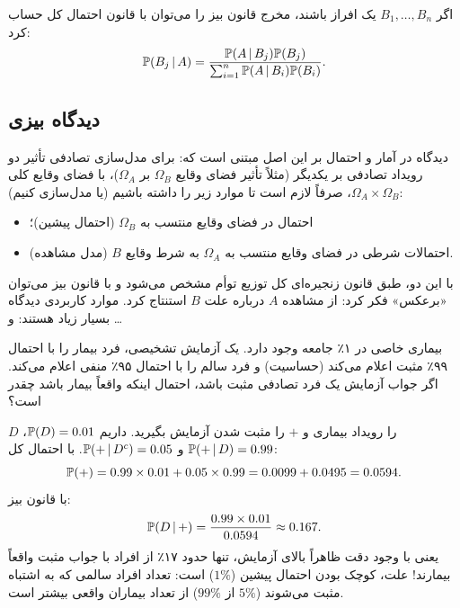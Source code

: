 \begin{theorem}
اگر $B_1,\ldots,B_n$ یک افراز باشند، مخرج قانون بیز را می‌توان با قانون احتمال کل حساب کرد:
\[
\mathbb{P}(B_j\,|\, A)=\frac{\mathbb{P}(A\,|\, B_j)\mathbb{P}(B_j)}{\sum_{i=1}^{n}\mathbb{P}(A\,|\, B_i)\mathbb{P}(B_i)} .
\]
\end{theorem}

\subsection{دیدگاه بیزی}
دیدگاه  در آمار و احتمال بر این اصل مبتنی است که: برای مدل‌سازی تصادفی تأثیر دو رویداد تصادفی بر یکدیگر (مثلاً تأثیر فضای وقایع $\Omega_B$ بر $\Omega_A$)، با فضای وقایع کلی $\Omega_A\times\Omega_B$، صرفاً لازم است تا موارد زیر را داشته باشیم (یا مدل‌سازی کنیم):
\begin{itemize}
\item احتمال در فضای وقایع منتسب به $\Omega_B$ (احتمال پیشین)؛
\item احتمالات شرطی در فضای وقایع منتسب به $\Omega_A$ به شرط وقایع $B$ (مدل مشاهده).
\end{itemize}
با این دو، طبق قانون زنجیره‌ای کل توزیع توأم مشخص می‌شود و با قانون بیز می‌توان «برعکس» فکر کرد: از مشاهده $A$ درباره علت $B$ استنتاج کرد. موارد کاربردی دیدگاه  بسیار زیاد هستند:
 و \ldots

\begin{example}
بیماری خاصی در ۱٪ جامعه وجود دارد. یک آزمایش تشخیصی، فرد بیمار را با احتمال ۹۹٪ مثبت اعلام می‌کند (حساسیت) و فرد سالم را با احتمال ۹۵٪ منفی اعلام می‌کند. اگر جواب آزمایش یک فرد تصادفی مثبت باشد، احتمال اینکه واقعاً بیمار باشد چقدر است؟
\begin{solution}
$D$ را رویداد بیماری و $+$ را مثبت شدن آزمایش بگیرید. داریم $\mathbb{P}(D)=0.01$، $\mathbb{P}(+\,|\, D)=0.99$ و $\mathbb{P}(+\,|\, D^c)=0.05$. با احتمال کل:
\[
\mathbb{P}(+)=0.99\times0.01+0.05\times0.99=0.0099+0.0495=0.0594 .
\]
با قانون بیز:
\[
\mathbb{P}(D\,|\, +)=\frac{0.99\times0.01}{0.0594}\approx0.167 .
\]
یعنی با وجود دقت ظاهراً بالای آزمایش، تنها حدود ۱۷٪ از افراد با جواب مثبت واقعاً بیمارند! علت، کوچک بودن احتمال پیشین ($1\%$) است: تعداد افراد سالمی که به اشتباه مثبت می‌شوند ($5\%$ از $99\%$) از تعداد بیماران واقعی بیشتر است.
\end{solution}
\end{example}

